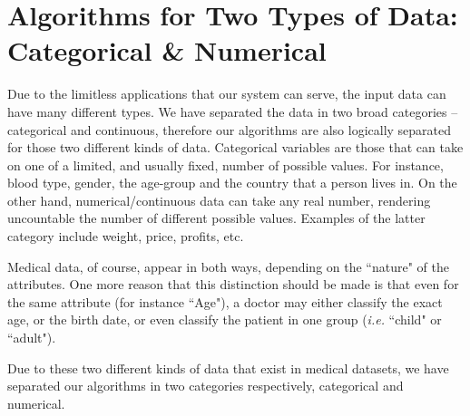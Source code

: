 \section{Algorithms for Two Types of Data: Categorical \& Numerical}\label{s:two-types-of-data}
Due to the limitless applications that our system can serve, the input data can have many different types.
We have separated the data in two broad categories -- categorical and continuous, therefore our algorithms are also logically separated for those two different kinds of data.
Categorical variables are those that can take on one of a limited, and usually fixed, number of possible values.
For instance, blood type, gender, the age-group and the country that a person lives in.
On the other hand, numerical/continuous data can take any real number, rendering uncountable the number of different possible values.
Examples of the latter category include weight, price, profits, etc.

Medical data, of course, appear in both ways, depending on the ``nature" of the attributes.
One more reason that this distinction should be made is that even for the same attribute (for instance ``Age"), a doctor may either classify the exact age, or the birth date, or even classify the patient in one group (\textit{i.e.} ``child" or ``adult").

Due to these two different kinds of data that exist in medical datasets, we have separated our algorithms in two categories respectively, categorical and numerical.







